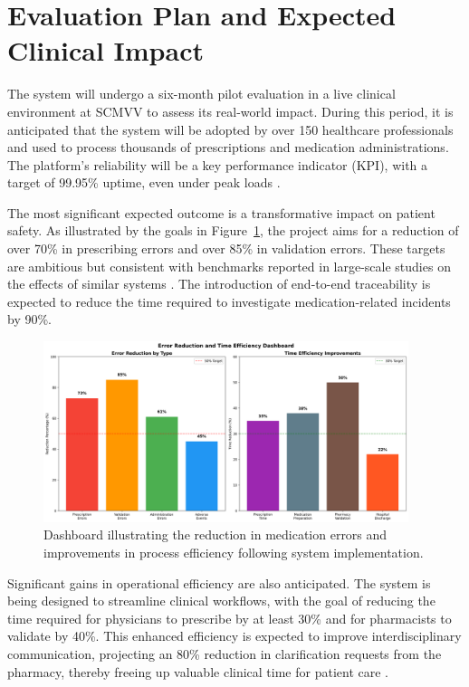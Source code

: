 \section{Evaluation Plan and Expected Clinical Impact}

The system will undergo a six-month pilot evaluation in a live clinical environment at SCMVV to assess its real-world impact. During this period, it is anticipated that the system will be adopted by over 150 healthcare professionals and used to process thousands of prescriptions and medication administrations. The platform's reliability will be a key performance indicator (KPI), with a target of 99.95\% uptime, even under peak loads \cite{nkenyereye2016}.

The most significant expected outcome is a transformative impact on patient safety. As illustrated by the goals in Figure~\ref{fig:error-reduction}, the project aims for a reduction of over 70\% in prescribing errors and over 85\% in validation errors. These targets are ambitious but consistent with benchmarks reported in large-scale studies on the effects of similar systems \cite{radley2013, bates2014}. The introduction of end-to-end traceability is expected to reduce the time required to investigate medication-related incidents by 90\%.

\begin{figure}[htbp]
    \centering
    \includegraphics[width=0.95\textwidth]{images/generated/error_reduction_dashboard.png}
    \caption{Dashboard illustrating the reduction in medication errors and improvements in process efficiency following system implementation.}
    \label{fig:error-reduction}
\end{figure}

Significant gains in operational efficiency are also anticipated. The system is being designed to streamline clinical workflows, with the goal of reducing the time required for physicians to prescribe by at least 30\% and for pharmacists to validate by 40\%. This enhanced efficiency is expected to improve interdisciplinary communication, projecting an 80\% reduction in clarification requests from the pharmacy, thereby freeing up valuable clinical time for patient care \cite{austin2018}.

